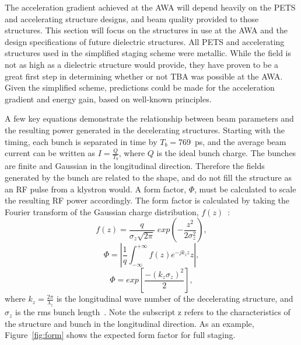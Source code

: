 The acceleration gradient achieved at the AWA will depend heavily 
on the PETS and accelerating structure designs, and beam quality 
provided to those structures. This section will focus on the 
structures in use at the AWA and the design specifications of future 
dielectric structures. All PETS and accelerating structures 
used in the simplified staging scheme were metallic. 
While the field is not as high as a dielectric structure would provide,
they have proven to be a great first step 
in determining whether or not TBA was possible at the AWA. Given 
the simplified scheme, predictions could be made for the acceleration 
gradient and energy gain, based on well-known principles. 

A few key equations demonstrate the relationship between beam 
parameters and the resulting power generated in the decelerating structures.  
Starting with the timing, each bunch is separated
in time by $T_{b}=$\SI{769}{ps}, and the average beam current can be written as $I=\frac{Q}{T_{b}}$, 
where $Q$ is the ideal bunch charge.
The bunches are finite and Gaussian in the longitudinal direction. Therefore the fields 
generated by the bunch are related to the shape, and do not fill the structure as an
RF pulse from a klystron would.  A form factor, $\Phi$, 
must be calculated to scale the resulting RF power accordingly. 
The form factor is calculated 
by taking the Fourier transform of the Gaussian charge distribution, $f(z)$~\cite{PETSeq}: 
\begin{equation}
f\left(z\right) = \frac{q}{\sigma_z \sqrt{2\pi}}\;exp\left(-\frac{z^2}{2\sigma^2_z}\right),
\end{equation}   
\begin{equation}
\Phi = \left|\frac{1}{q}\int_{-\infty}^{+\infty}f\left(z\right)e^{-jk_z z}z\right|,
\end{equation}
\begin{equation}
\Phi=exp\left[\frac{-(k_{z}\sigma_{z})^{2}}{2}\right] \nonumber,
\end{equation}
where $k_{z}=\frac{2\pi}{\lambda_{z}}$ is the longitudinal wave number
of the decelerating structure, and $\sigma_{z}$ is the rms bunch length~\cite{PETSeq}. 
Note the subscript z refers to the characteristics of the structure and bunch in the longitudinal
direction. 
As an example, Figure~\ref{fig:form} shows the expected form factor for full staging.
